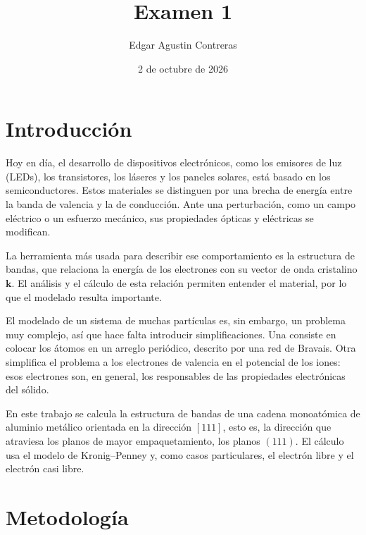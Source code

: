 \documentclass[hidelinks]{article}
\begin{document}
\title{Examen 1}
\author{Edgar Agustin Contreras}
\date{2 de octubre de 2026}

\maketitle

\setcounter{tocdepth}{2}


\section{Introducción}

Hoy en día, el desarrollo de dispositivos electrónicos, como los emisores de luz (LEDs), los transistores, los láseres y los paneles solares, está basado en los semiconductores. Estos materiales se distinguen por una brecha de energía entre la banda de valencia y la de conducción. Ante una perturbación, como un campo eléctrico o un esfuerzo mecánico, sus propiedades ópticas y eléctricas se modifican.

La herramienta más usada para describir ese comportamiento es la estructura de bandas, que relaciona la energía de los electrones con su vector de onda cristalino $\mathbf{k}$. El análisis y el cálculo de esta relación permiten entender el material, por lo que el modelado resulta importante.

El modelado de un sistema de muchas partículas es, sin embargo, un problema muy complejo, así que hace falta introducir simplificaciones. Una consiste en colocar los átomos en un arreglo periódico, descrito por una red de Bravais. Otra simplifica el problema a los electrones de valencia en el potencial de los iones: esos electrones son, en general, los responsables de las propiedades electrónicas del sólido.

En este trabajo se calcula la estructura de bandas de una cadena monoatómica de aluminio metálico orientada en la dirección $[111]$, esto es, la dirección que atraviesa los planos de mayor empaquetamiento, los planos $(111)$. El cálculo usa el modelo de Kronig--Penney y, como casos particulares, el electrón libre y el electrón casi libre.

\section{Metodología}
\end{document}
